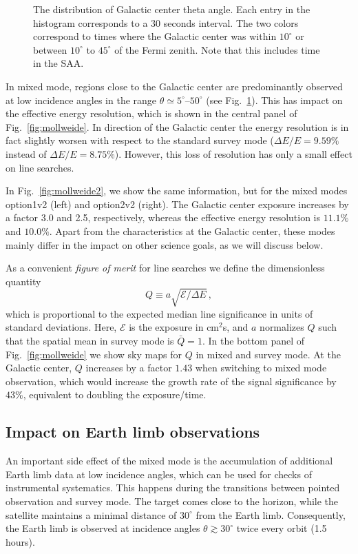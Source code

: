 \documentclass[aps,prd,superscriptaddress,nofootinbib,fixlfloat, 12pt]{revtex4-1}
\begin{document}
\begin{figure}[t]
\begin{center}
    \vspace{-0.5cm}
  \end{center}
  \caption{The distribution of Galactic center theta angle. Each entry in the
  histogram corresponds to a 30 seconds interval. The two colors correspond to
  times where the Galactic center was within $10^\circ$ or between $10^\circ$ to $45^\circ$
  of the Fermi zenith. Note that this includes time in the SAA.} 
  \label{fig:thetaDist}
\end{figure}

In mixed mode, regions close to the Galactic center are predominantly observed
at low incidence angles in the range $\theta\simeq5^\circ$--$50^\circ$ (see
Fig.~\ref{fig:thetaDist}). This has impact on the effective energy resolution,
which is shown in the central panel of Fig.~\ref{fig:mollweide}. In direction
of the Galactic center the energy resolution is in fact slightly worsen with respect to the
standard survey mode ($\Delta E/E=9.59\%$ instead of $\Delta E/E=8.75\%$).
However, this loss of resolution has only a small effect on line searches.

In Fig.~\ref{fig:mollweide2}, we show the same information, but for the mixed
modes option1v2 (left) and option2v2 (right). The Galactic center exposure increases by a
factor 3.0 and 2.5, respectively, whereas the effective energy resolution is
$11.1\%$ and $10.0\%$. Apart from the characteristics at the Galactic center, these modes
mainly differ in the impact on other science goals, as we will discuss below.
\medskip

As a convenient \emph{figure of merit} for line searches we define the
dimensionless quantity $$Q\equiv a\sqrt{\mathcal{E}/\Delta E}\,,$$ which is
proportional to the expected median line significance in units of standard
deviations.  Here, $\mathcal{E}$ is the exposure in cm$^2$s, and $a$
normalizes $Q$ such that the spatial mean in survey mode is $\bar Q=1$. In the
bottom panel of Fig.~\ref{fig:mollweide} we show sky maps for $Q$ in mixed and
survey mode.  At the Galactic center, $Q$ increases by a factor $1.43$ when
switching to mixed mode observation, which would increase the growth rate of
the signal significance by $43\%$, equivalent to doubling the exposure/time. 

\subsection{Impact on Earth limb observations}
An important side effect of the mixed mode is the accumulation of
additional Earth limb data at low incidence angles, which can be used for
checks of instrumental systematics. This happens during the
transitions between pointed observation and survey mode. The target comes
close to the horizon, while the satellite maintains a minimal distance of
$30^\circ$ from the Earth limb. Consequently, the Earth limb is observed at
incidence angles $\theta\gtrsim30^\circ$ twice every orbit (1.5 hours).
\end{document}
